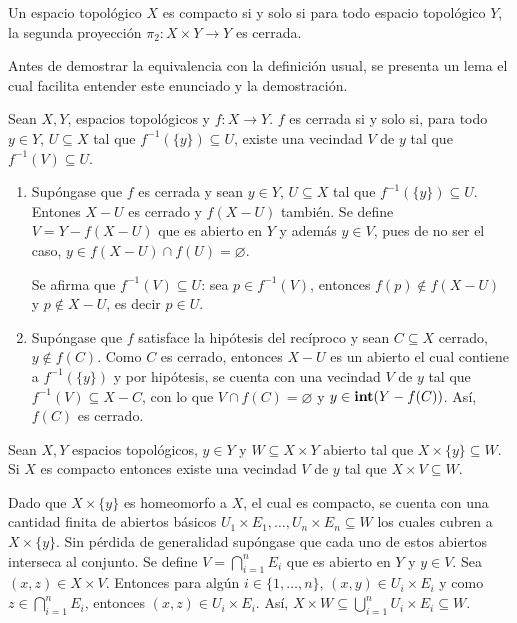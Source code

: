 \begin{Def}
  Un espacio topológico $X$ es compacto si y solo si
  para todo espacio topológico $Y$, la segunda proyección
  $\pi_2:X\times Y\longrightarrow Y$ es cerrada.
\end{Def}

Antes de demostrar la equivalencia con la definición usual, se presenta
un lema el cual facilita entender este enunciado y la demostración.

\begin{Lema}
  Sean $X,Y$, espacios topológicos y $f:X\longrightarrow Y$.
  $f$ es cerrada si y solo si, para todo $y\in Y$, $U\subseteq X$
  tal que $f^{-1}(\{y\})\subseteq U$, existe una vecindad $V$ de $y$
  tal que $f^{-1}(V)\subseteq U$.
\end{Lema}
\begin{Demo}
  \begin{enumerate}
    \item Supóngase que $f$ es cerrada y sean $y\in Y$, $U\subseteq X$ tal que $f^{-1}(\{y\})\subseteq U$.
    Entones $X-U$ es cerrado y $f(X-U)$ también. Se define $V=Y-f(X-U)$ que es abierto en $Y$ y además
    $y\in V$, pues de no ser el caso, $y\in f(X-U)\cap f(U)=\varnothing$.

    Se afirma que $f^{-1}(V)\subseteq U$: sea $p\in f^{-1}(V)$, entonces $f(p)\not\in f(X-U)$ y
    $p\not\in X-U$, es decir $p\in U$.
    \item Supóngase que $f$ satisface la hipótesis del recíproco y sean $C\subseteq X$ cerrado, $y\not\in f(C)$.
    Como $C$ es cerrado, entonces $X-U$ es un abierto el cual contiene a $f^{-1}(\{y\})$ y por hipótesis,
    se cuenta con una vecindad $V$ de $y$ tal que $f^{-1}(V)\subseteq X-C$, con lo que
    $V\cap f(C)=\varnothing$ y $y\in\operatorname{\mathrm{\mathbf{int}}}(Y-f(C))$. Así, $f(C)$ es cerrado.
  \end{enumerate}
\end{Demo}

\begin{Lema}
  Sean $X,Y$ espacios topológicos, $y\in Y$ y $W\subseteq X\times Y$ abierto tal que
  $X\times\{y\}\subseteq W$. Si $X$ es compacto entonces existe una vecindad $V$ de $y$ tal
  que $X\times V\subseteq W$.
\end{Lema}
\begin{Demo}
  Dado que $X\times\{y\}$ es homeomorfo a $X$, el cual es compacto, se cuenta con
  una cantidad finita de abiertos básicos $U_1\times E_1,\dots,U_n\times E_n\subseteq W$
  los cuales cubren a $X\times\{y\}$. Sin pérdida de generalidad supóngase que
  cada uno de estos abiertos interseca al conjunto. Se define
  $V=\bigcap_{i=1}^n E_i$ que es abierto en $Y$ y $y\in V$. Sea $(x,z)\in X\times V$.
  Entonces para algún $i\in\{1,\dots,n\}$, $(x,y)\in U_i\times E_i$ y como
  $z\in\bigcap_{i=1}^n E_i$, entonces $(x,z)\in U_i\times E_i$. Así,
  $X\times W\subseteq\bigcup_{i=1}^nU_i\times E_i\subseteq W$.
\end{Demo}

